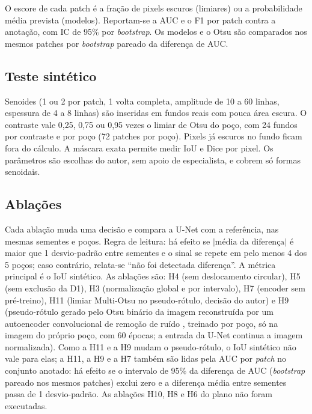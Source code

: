 \documentclass[12pt]{article}
\newif\ifrascunho \rascunhofalse
\newcommand{\fonte}[1]{\ifrascunho\textcolor{blue}{\small(README, #1)}\fi}
\begin{document}
O escore de cada patch é a fração de pixels escuros (limiares) ou a probabilidade média prevista (modelos). Reportam-se a AUC e o F1 por patch contra a anotação, com IC de 95\% por \textit{bootstrap}. Os modelos e o Otsu são comparados nos mesmos patches por \textit{bootstrap} pareado da diferença de AUC.

\subsection{Teste sintético}

Senoides (1 ou 2 por patch, 1 volta completa, amplitude de 10 a 60 linhas, espessura de 4 a 8 linhas) são inseridas em fundos reais com pouca área escura. O contraste vale 0,25, 0,75 ou 0,95 vezes o limiar de Otsu do poço, com 24 fundos por contraste e por poço (72 patches por poço). Pixels já escuros no fundo ficam fora do cálculo. A máscara exata permite medir IoU e Dice por pixel. Os parâmetros são escolhas do autor, sem apoio de especialista, e cobrem só formas senoidais. \fonte{itens 64 a 66; U15}

\subsection{Ablações}

Cada ablação muda uma decisão e compara a U-Net com a referência, nas mesmas sementes e poços. Regra de leitura: há efeito se $|\text{média da diferença}|$ é maior que 1 desvio-padrão entre sementes e o sinal se repete em pelo menos 4 dos 5 poços; caso contrário, relata-se ``não foi detectada diferença''. A métrica principal é o IoU sintético. As ablações são: H4 (sem deslocamento circular), H5 (sem exclusão da D1), H3 (normalização global e por intervalo), H7 (encoder sem pré-treino), H11 (limiar Multi-Otsu no pseudo-rótulo, decisão do autor) e H9 (pseudo-rótulo gerado pelo Otsu binário da imagem reconstruída por um autoencoder convolucional de remoção de ruído \cite{silva2026}, treinado por poço, só na imagem do próprio poço, com 60 épocas; a entrada da U-Net continua a imagem normalizada). Como a H11 e a H9 mudam o pseudo-rótulo, o IoU sintético não vale para elas; a H11, a H9 e a H7 também são lidas pela AUC por \textit{patch} no conjunto anotado: há efeito se o intervalo de 95\% da diferença de AUC (\textit{bootstrap} pareado nos mesmos patches) exclui zero e a diferença média entre sementes passa de 1 desvio-padrão. \fonte{itens 79 e 80} As ablações H10, H8 e H6 do plano não foram executadas.
\end{document}

